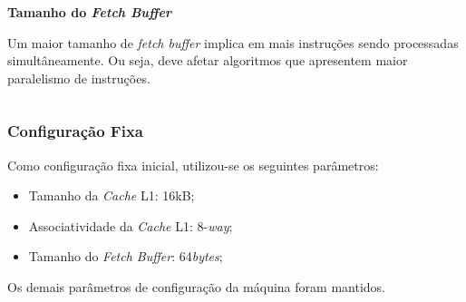 \documentclass{beamer}
\begin{document}
\begin{frame}
\begin{columns}
\begin{column}{0.3\textwidth}
\begin{center}
                    \Large
                    \textbf{Tamanho do \textit{Fetch Buffer}}
                \end{center}

                \justifying
                \footnotesize
                Um maior tamanho de \textit{fetch buffer} implica em mais instruções sendo processadas simultâneamente. Ou seja,
                deve afetar algoritmos que apresentem maior paralelismo de instruções.

            \end{column}
        \end{columns}

    \end{frame}

    \begin{frame}
        \frametitle{Configuração Fixa}

        \LARGE
        Como configuração fixa inicial, utilizou-se os seguintes parâmetros:

        \begin{itemize}
            \item Tamanho da \textit{Cache} L1: 16kB;
            \item Associatividade da \textit{Cache} L1: 8-\textit{way};
            \item Tamanho do \textit{Fetch Buffer}: 64\textit{bytes};
        \end{itemize}
        Os demais parâmetros de configuração da máquina foram mantidos.

    \end{frame}
\end{document}
